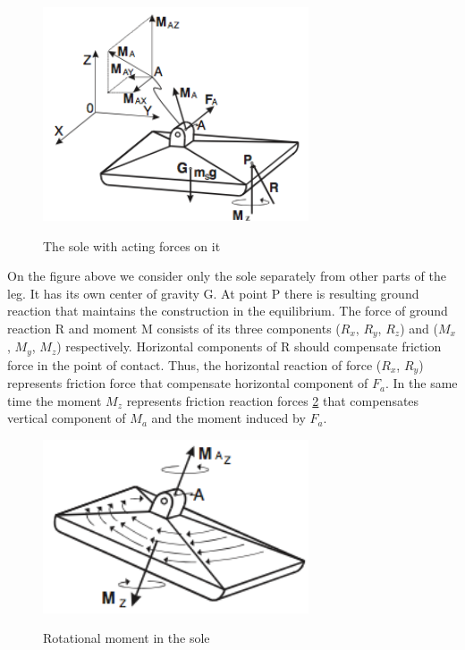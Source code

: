 \documentclass[11pt,a4paper]{report}
\begin{document}
	\begin{figure}[h!]
		\vspace{-0.2cm}
		\centering
		{\includegraphics[width=0.7\textwidth]{1}}
		\caption{The sole with acting forces on it}
		\label{fig:1}
		\vspace{-0.1cm}
	\end{figure}

On the figure above we consider only the sole separately from other parts of the leg. It has its own center of gravity G. At point P there is resulting ground reaction that maintains the construction in the equilibrium. The force of ground reaction R and moment M consists of its three components ($R_x$, $R_y$, $R_z$) and ($M_x$, $M_y$, $M_z$) respectively. Horizontal components of R should compensate friction force in the point of contact. Thus, the horizontal reaction of force ($R_x$, $R_y$) represents 
friction force that compensate horizontal component of $F_a$. In the same time the moment $M_z$ represents friction reaction forces \cref{fig:2} that compensates vertical component of $M_a$ and the moment induced by $F_a$. \cite{vukobratovic2004zero}

	\begin{figure}[h!]
		\vspace{-0.2cm}
		\centering
		{\includegraphics[width=0.7\textwidth]{2}}
		\caption{Rotational moment in the sole}
		\label{fig:2}
		\vspace{-0.1cm}
	\end{figure}
\end{document}

